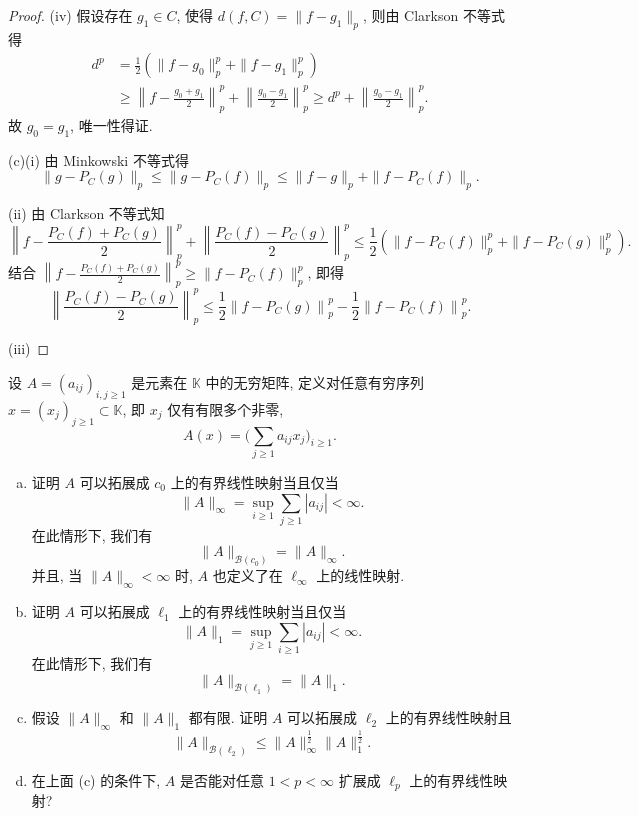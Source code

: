 \begin{proof}
     (iv) 假设存在 $g_1\in C$, 使得 $d(f,C)=\|f-g_1\|_p$, 则由 Clarkson 不等式得
     \begin{align*}
         d^p
         & =\frac{1}{2}\left(\|f-g_0\|_p^p+\|f-g_1\|_p^p\right) \\
         & \geq\left\|f-\frac{g_0+g_1}{2}\right\|_p^p+\left\|\frac{g_0-g_1}{2}\right\|_p^p\geq d^p+\left\|\frac{g_0-g_1}{2}\right\|_p^p.
     \end{align*}
     故 $g_0=g_1$, 唯一性得证.

     (c)(i) 由 Minkowski 不等式得
     \[\|g-P_C(g)\|_p\leq\|g-P_C(f)\|_p\leq\|f-g\|_p+\|f-P_C(f)\|_p.\]

     (ii) 由 Clarkson 不等式知
     \[\left\|f-\frac{P_C(f)+P_C(g)}{2}\right\|_p^p+\left\|\frac{P_C(f)-P_C(g)}{2}\right\|_p^p\leq\frac{1}{2}\left(\|f-P_C(f)\|_p^p+\|f-P_C(g)\|_p^p\right).\]
     结合 $\left\|f-\frac{P_C(f)+P_C(g)}{2}\right\|_p^p\geq \|f-P_C(f)\|_p^p$, 即得
     \[
         \left\|\frac{P_{C}(f)-P_{C}(g)}{2}\right\|_{p}^{p} \leq \frac{1}{2}\left\|f-P_{C}(g)\right\|_{p}^{p}-\frac{1}{2}\left\|f-P_{C}(f)\right\|_{p}^{p}.
     \]

     (iii) 
\end{proof}


\begin{exercise}
  设 $A = (a_{ij})_{i,j\geq 1}$ 是元素在 $\mathbb{K}$ 中的无穷矩阵,
  定义对任意有穷序列 $x = (x_j)_{j\geq 1}\subset \mathbb{K}$,
  即 $x_j$ 仅有有限多个非零,
  \[ A(x) = \biggl(\sum_{j\geq 1} a_{ij} x_j\biggr)_{i\geq 1}. \]
  \begin{enumerate}[(a)]
    \item 证明 $A$ 可以拓展成 $c_0$ 上的有界线性映射当且仅当
      \[ \|A\|_\infty = \sup_{i\geq 1} \sum_{j\geq 1} |a_{ij}| < \infty. \]
      在此情形下, 我们有
      \[ \|A\|_{\mathcal{B}(c_0)} = \|A\|_{\infty}. \]
      并且, 当 $\|A\|_{\infty} < \infty$ 时, $A$ 也定义了在 $\ell_{\infty}$ 上的线性映射.
    \item 证明 $A$ 可以拓展成 $\ell_1$ 上的有界线性映射当且仅当
      \[ \|A\|_1 = \sup_{j\geq 1} \sum_{i\geq 1} |a_{ij}| < \infty. \]
      在此情形下, 我们有
      \[ \|A\|_{\mathcal{B}(\ell_1)} = \|A\|_1. \]
    \item 假设 $\|A\|_\infty$ 和 $\|A\|_1$ 都有限. 证明 $A$ 可以拓展成 $\ell_2$
      上的有界线性映射且
      \[ \|A\|_{\mathcal{B}(\ell_2)} \leq \|A\|_{\infty}^{\frac12} \|A\|_1^{\frac12}. \]
    \item 在上面 (c) 的条件下, $A$ 是否能对任意 $1<p<\infty$ 扩展成
      $\ell_p$ 上的有界线性映射?
  \end{enumerate}
\end{exercise}

